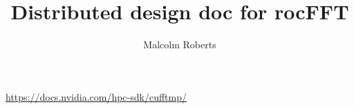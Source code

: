 \documentclass[12pt]{article}
\title{Distributed design doc for rocFFT}
\author{Malcolm Roberts}
\renewcommand{\(}{\left(}
\renewcommand{\)}{\right)}
\begin{document}
\maketitle

\url{https://docs.nvidia.com/hpc-sdk/cufftmp/}
\end{document}
